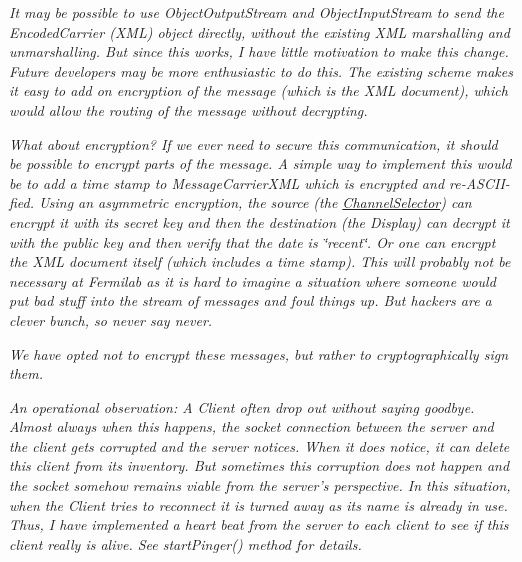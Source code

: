 {\itshape }

{\itshape }

{\itshape  It may be possible to use Object\-Output\-Stream and Object\-Input\-Stream to send the Encoded\-Carrier (X\-M\-L) object directly, without the existing X\-M\-L marshalling and unmarshalling. But since this works, I have little motivation to make this change. Future developers may be more enthusiastic to do this. The existing scheme makes it easy to add on encryption of the message (which is the X\-M\-L document), which would allow the routing of the message without decrypting. }

{\itshape }

{\itshape }

{\itshape  What about encryption? If we ever need to secure this communication, it should be possible to encrypt parts of the message. A simple way to implement this would be to add a time stamp to Message\-Carrier\-X\-M\-L which is encrypted and re-\/\-A\-S\-C\-I\-I-\/fied. Using an asymmetric encryption, the source (the \hyperlink{classgov_1_1fnal_1_1ppd_1_1dd_1_1ChannelSelector}{Channel\-Selector}) can encrypt it with its secret key and then the destination (the Display) can decrypt it with the public key and then verify that the date is \char`\"{}recent\char`\"{}. Or one can encrypt the X\-M\-L document itself (which includes a time stamp). This will probably not be necessary at Fermilab as it is hard to imagine a situation where someone would put bad stuff into the stream of messages and foul things up. But hackers are a clever bunch, so never say never. }

{\itshape  }

{\itshape  We have opted not to encrypt these messages, but rather to cryptographically sign them. }

{\itshape  }

{\itshape  An operational observation\-: A Client often drop out without saying goodbye. Almost always when this happens, the socket connection between the server and the client gets corrupted and the server notices. When it does notice, it can delete this client from its inventory. But sometimes this corruption does not happen and the socket somehow remains viable from the server's perspective. In this situation, when the Client tries to reconnect it is turned away as its name is already in use. Thus, I have implemented a heart beat from the server to each client to see if this client really is alive. See start\-Pinger() method for details. }

